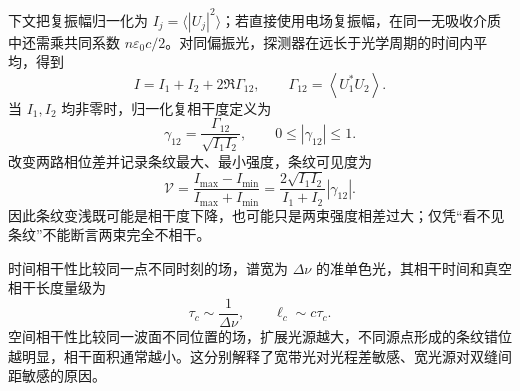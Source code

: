 下文把复振幅归一化为 $I_j=\langle|U_j|^2\rangle$；若直接使用电场复振幅，在同一无吸收介质中还需乘共同系数 $n\varepsilon_0c/2$。对同偏振光，探测器在远长于光学周期的时间内平均，得到
\begin{equation}
 I=I_1+I_2+2\Re\Gamma_{12},
 \qquad
 \Gamma_{12}=\left\langle U_1^*U_2\right\rangle.
\end{equation}
当 $I_1,I_2$ 均非零时，归一化复相干度定义为
\begin{equation}
 \gamma_{12}=\frac{\Gamma_{12}}{\sqrt{I_1I_2}},
 \qquad 0\le |\gamma_{12}|\le1.
\end{equation}
改变两路相位差并记录条纹最大、最小强度，条纹可见度为
\begin{equation}
 \mathcal V=\frac{I_{\max}-I_{\min}}{I_{\max}+I_{\min}}
 =\frac{2\sqrt{I_1I_2}}{I_1+I_2}|\gamma_{12}|.
\end{equation}
因此条纹变浅既可能是相干度下降，也可能只是两束强度相差过大；仅凭“看不见条纹”不能断言两束完全不相干。

时间相干性比较同一点不同时刻的场，谱宽为 $\Delta\nu$ 的准单色光，其相干时间和真空相干长度量级为
\begin{equation}
 \tau_c\sim\frac1{\Delta\nu},
 \qquad \ell_c\sim c\tau_c.
\end{equation}
空间相干性比较同一波面不同位置的场，扩展光源越大，不同源点形成的条纹错位越明显，相干面积通常越小。这分别解释了宽带光对光程差敏感、宽光源对双缝间距敏感的原因。

